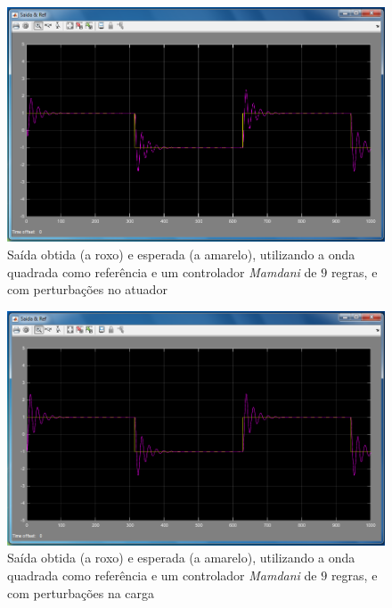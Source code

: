 \documentclass{article}
\begin{document}
\begin{figure}[h]
  \centering
      \includegraphics[scale=0.3]{Images/Mamdani_9_square_actuator.png}
  \caption{Saída obtida (a roxo) e esperada (a amarelo), utilizando a onda quadrada como referência e um controlador \emph{Mamdani} de $9$ regras, e com perturbações no atuador}
\end{figure}

\begin{figure}[h]
  \centering
      \includegraphics[scale=0.3]{Images/Mamdani_9_square_charge.png}
  \caption{Saída obtida (a roxo) e esperada (a amarelo), utilizando a onda quadrada como referência e um controlador \emph{Mamdani} de $9$ regras, e com perturbações na carga}
\end{figure}
\end{document}
